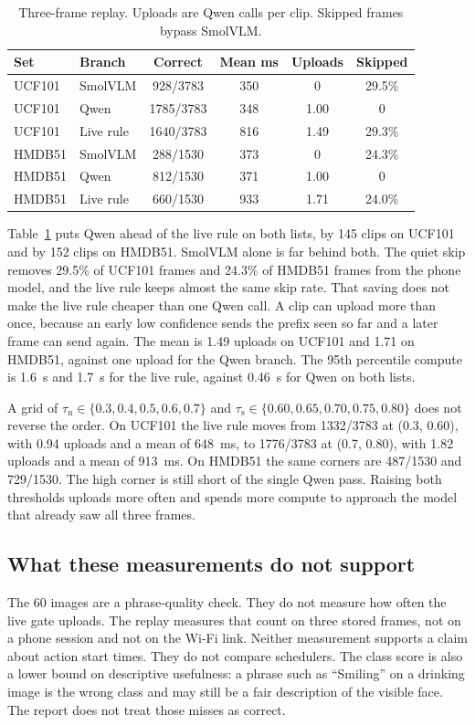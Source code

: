 \begin{table}[t]
\caption{Three-frame replay. Uploads are Qwen calls per clip. Skipped frames bypass SmolVLM.}
\label{tab:video}
\centering
\footnotesize
\setlength{\tabcolsep}{4pt}
\begin{tabular}{llcccc}
\toprule
Set & Branch & Correct & Mean ms & Uploads & Skipped \\
\midrule
UCF101 & SmolVLM & 928/3783 & 350 & 0 & 29.5\% \\
UCF101 & Qwen & 1785/3783 & 348 & 1.00 & 0 \\
UCF101 & Live rule & 1640/3783 & 816 & 1.49 & 29.3\% \\
HMDB51 & SmolVLM & 288/1530 & 373 & 0 & 24.3\% \\
HMDB51 & Qwen & 812/1530 & 371 & 1.00 & 0 \\
HMDB51 & Live rule & 660/1530 & 933 & 1.71 & 24.0\% \\
\bottomrule
\end{tabular}
\end{table}

Table~\ref{tab:video} puts Qwen ahead of the live rule on both lists, by
145 clips on UCF101 and by 152 clips on HMDB51. SmolVLM alone is far
behind both. The quiet skip removes 29.5\% of UCF101 frames and 24.3\% of
HMDB51 frames from the phone model, and the live rule keeps almost the
same skip rate. That saving does not make the live rule cheaper than one
Qwen call. A clip can upload more than once, because an early low
confidence sends the prefix seen so far and a later frame can send again.
The mean is 1.49 uploads on UCF101 and 1.71 on HMDB51, against one upload
for the Qwen branch. The 95th percentile compute is 1.6~s and 1.7~s for
the live rule, against 0.46~s for Qwen on both lists.

A grid of \(\tau_{\mathrm{u}}\in\{0.3,0.4,0.5,0.6,0.7\}\) and
\(\tau_{\mathrm{s}}\in\{0.60,0.65,0.70,0.75,0.80\}\) does not reverse the
order. On UCF101 the live rule moves from 1332/3783 at (0.3, 0.60), with
0.94 uploads and a mean of 648~ms, to 1776/3783 at (0.7, 0.80), with 1.82
uploads and a mean of 913~ms. On HMDB51 the same corners are 487/1530 and
729/1530. The high corner is still short of the single Qwen pass. Raising
both thresholds uploads more often and spends more compute to approach the
model that already saw all three frames.

\subsection{What these measurements do not support}

The 60 images are a phrase-quality check. They do not measure how often
the live gate uploads. The replay measures that count on three stored
frames, not on a phone session and not on the Wi-Fi link. Neither
measurement supports a claim about action start times. They do not compare
schedulers. The class score is also a lower bound on descriptive
usefulness: a phrase such as ``Smiling'' on a drinking image is the wrong
class and may still be a fair description of the visible face. The report
does not treat those misses as correct.
